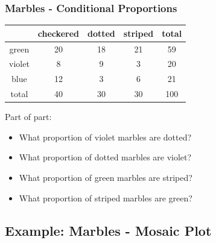 \begin{frame}
\frametitle{Marbles - Conditional Proportions}

\begin{center}
\begin{tabular}{c|c c c | c}
       & checkered & dotted & striped & total \\ \hline
green  &  20       &  18    & 21 & 59 \\
violet & 8         &  9     & 3  & 20 \\
blue   & 12        & 3      & 6  & 21 \\ \hline
total  & 40        & 30     & 30 & 100 
\end{tabular}
\end{center}

Part of part:
\begin{itemize}
\item What proportion of violet marbles are dotted? 
\item What proportion of dotted marbles are violet? 
\item What proportion of green marbles are striped? 
\item What proportion of striped marbles are green? 
\end{itemize}

\end{frame}



\subsection{Example: Marbles - Mosaic Plot}



